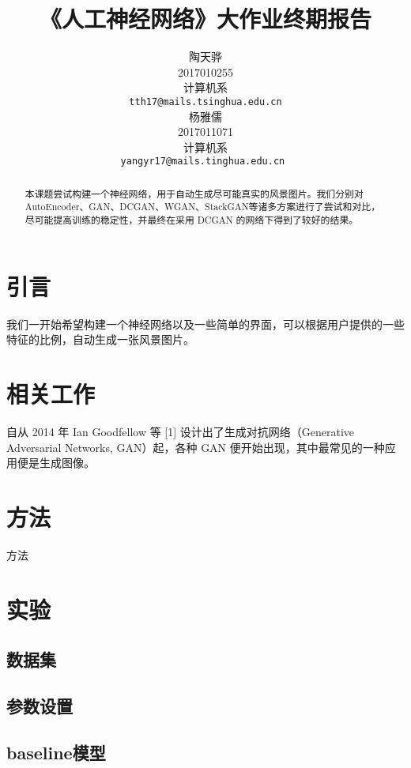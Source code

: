 \documentclass{article}
\title{《人工神经网络》大作业终期报告}
\author{%
  陶天骅 \\
  2017010255 \\
  计算机系 \\
  \texttt{tth17@mails.tsinghua.edu.cn} \\
  \And
  杨雅儒\\
  2017011071 \\
  计算机系 \\
  \texttt{yangyr17@mails.tinghua.edu.cn
  } \\
}
\begin{document}
\begin{CJK*}{UTF8}{gbsn}
\maketitle


\begin{abstract}

本课题尝试构建一个神经网络，用于自动生成尽可能真实的风景图片。我们分别对AutoEncoder、GAN、DCGAN、WGAN、StackGAN等诸多方案进行了尝试和对比，尽可能提高训练的稳定性，并最终在采用 DCGAN 的网络下得到了较好的结果。

\end{abstract}

\section{引言}

我们一开始希望构建一个神经网络以及一些简单的界面，可以根据用户提供的一些特征的比例，自动生成一张风景图片。

\section{相关工作}

自从 2014 年 Ian Goodfellow 等 [1] 设计出了生成对抗网络（Generative Adversarial Networks, GAN）起，各种 GAN 便开始出现，其中最常见的一种应用便是生成图像。

\section{方法}

方法

\section{实验}

  \subsection{数据集}

  \subsection{参数设置}

  \subsection{baseline模型}


\end{CJK*}
\end{document}
